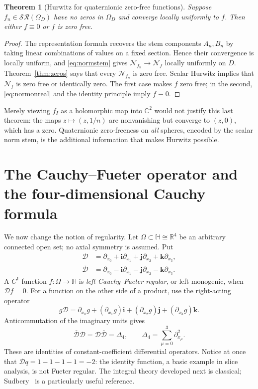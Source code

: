 \documentclass[11pt,a4paper]{article}
\numberwithin{equation}{section}
\newtheorem{theorem}{Theorem}[section]
\theoremstyle{definition}
\theoremstyle{remark}
\newcommand{\R}{\mathbb R}
\newcommand{\C}{\mathbb C}
\newcommand{\HH}{\mathbb H}
\newcommand{\ii}{\mathbf i}
\newcommand{\jj}{\mathbf j}
\newcommand{\kk}{\mathbf k}
\newcommand{\SR}{\mathcal{SR}}
\newcommand{\cD}{\mathcal D}
\newcommand{\lap}{\Delta_4}
\newcommand{\Norm}{\mathcal N}
\begin{document}
\begin{theorem}[Hurwitz for quaternionic zero-free functions]
\label{thm:hurwitz}
Suppose $f_n\in\SR(\Omega_D)$ have no zeros in $\Omega_D$ and converge
locally uniformly to $f$. Then either $f\equiv0$ or $f$ is zero free.
\end{theorem}
\begin{proof}
The representation formula recovers the stem components $A_n,B_n$ by taking
linear combinations of values on a fixed section. Hence their convergence
is locally uniform, and \eqref{eq:normstem} gives
$\Norm_{f_n}\to\Norm_f$ locally uniformly on $D$.
Theorem~\ref{thm:zeros} says that every $\Norm_{f_n}$ is zero free.
Scalar Hurwitz implies that $\Norm_f$ is zero free or identically zero.
The first case makes $f$ zero free; in the second, \eqref{eq:normonreal} and
the identity principle imply $f\equiv0$.
\end{proof}
Merely viewing $f_I$ as a holomorphic map into $\C^2$ would not justify this
last theorem: the maps $z\mapsto(z,1/n)$ are nonvanishing but converge to
$(z,0)$, which has a zero. Quaternionic zero-freeness on \emph{all} spheres,
encoded by the scalar norm stem, is the additional information that makes
Hurwitz possible.

\section{The Cauchy--Fueter operator and the four-dimensional Cauchy formula}
\label{sec:fueter-cauchy}
We now change the notion of regularity. Let $\Omega\subset\HH\cong\R^4$ be
an arbitrary connected open set; no axial symmetry is assumed. Put
\begin{align}
 \cD&=\partial_{x_0}+\ii\partial_{x_1}
             +\jj\partial_{x_2}+\kk\partial_{x_3},\\
 \overline{\cD}&=\partial_{x_0}-\ii\partial_{x_1}
             -\jj\partial_{x_2}-\kk\partial_{x_3}.
\end{align}
A $C^1$ function $f:\Omega\to\HH$ is \emph{left Cauchy--Fueter regular},
or left monogenic, when $\cD f=0$. For a function on the other side of a
product, use the right-acting operator
\[
 g\cD=\partial_{x_0}g+(\partial_{x_1}g)\ii
                  +(\partial_{x_2}g)\jj+(\partial_{x_3}g)\kk.
\]
Anticommutation of the imaginary units gives
\begin{equation}\label{eq:factor-laplacian}
 \overline{\cD}\cD=\cD\overline{\cD}=\lap,
 \qquad \lap=\sum_{\mu=0}^{3}\partial_{x_\mu}^2.
\end{equation}
These are identities of constant-coefficient differential operators. Notice
at once that $\cD q=1-1-1-1=-2$: the identity function, a basic example in
slice analysis, is not Fueter regular. The integral theory developed next is
classical; Sudbery~\cite{Sudbery} is a particularly useful reference.
\end{document}
